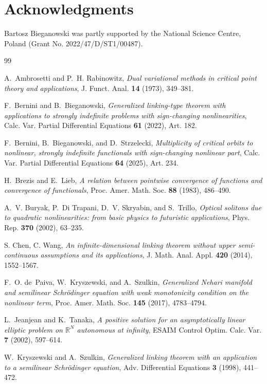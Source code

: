 \documentclass[11pt]{amsart}
\numberwithin{equation}{section}
\theoremstyle{definition}
\begin{document}
\section*{Acknowledgments}
Bartosz Bieganowski was partly supported by the National Science Centre, Poland (Grant No. 2022/47/D/ST1/00487).

\begin{thebibliography}{99}

A.~Ambrosetti and P.~H. Rabinowitz,
\emph{Dual variational methods in critical point theory and applications},
J. Funct. Anal. \textbf{14} (1973), 349--381.

F.~Bernini and B.~Bieganowski,
\emph{Generalized linking-type theorem with applications to strongly indefinite problems with sign-changing nonlinearities},
Calc. Var. Partial Differential Equations \textbf{61} (2022), Art. 182.

F.~Bernini, B.~Bieganowski, and D.~Strzelecki,
\emph{Multiplicity of critical orbits to nonlinear, strongly indefinite functionals with sign-changing nonlinear part},
Calc. Var. Partial Differential Equations \textbf{64} (2025), Art. 234.

H.~Brezis and E.~Lieb,
\emph{A relation between pointwise convergence of functions and convergence of functionals},
Proc. Amer. Math. Soc. \textbf{88} (1983), 486--490.

A.~V. Buryak, P.~Di Trapani, D.~V. Skryabin, and S.~Trillo,
\emph{Optical solitons due to quadratic nonlinearities: from basic physics to futuristic applications},
Phys. Rep. \textbf{370} (2002), 63--235.

S. Chen, C. Wang,
\emph{An infinite-dimensional linking theorem without upper semi-continuous assumptions and its applications},
J. Math. Anal. Appl. \textbf{420} (2014), 1552--1567.

F.~O. de~Paiva, W.~Kryszewski, and A.~Szulkin,
\emph{Generalized Nehari manifold and semilinear Schrödinger equation with weak monotonicity condition on the nonlinear term},
Proc. Amer. Math. Soc. \textbf{145} (2017), 4783--4794.

L.~Jeanjean and K.~Tanaka,
\emph{A positive solution for an asymptotically linear elliptic problem on $\mathbb{R}^N$ autonomous at infinity},
ESAIM Control Optim. Calc. Var. \textbf{7} (2002), 597--614.

W.~Kryszewski and A.~Szulkin,
\emph{Generalized linking theorem with an application to a semilinear Schrödinger equation},
Adv. Differential Equations \textbf{3} (1998), 441--472.


\end{thebibliography}
\end{document}
